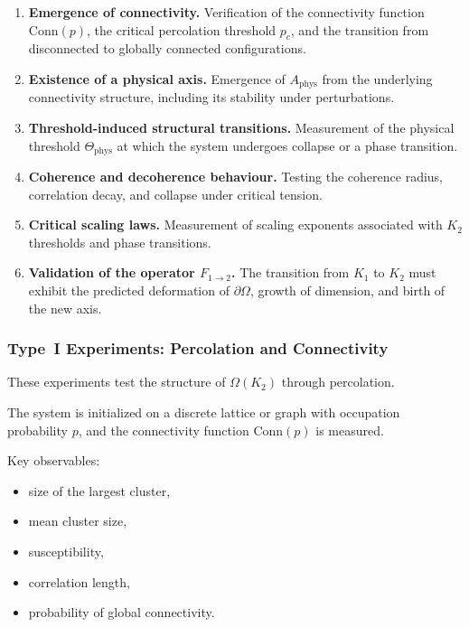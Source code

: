 \begin{enumerate}
    \item \textbf{Emergence of connectivity.}  
          Verification of the connectivity function $\mathrm{Conn}(p)$, 
          the critical percolation threshold $p_c$, and the transition 
          from disconnected to globally connected configurations.

    \item \textbf{Existence of a physical axis.}  
          Emergence of $A_{\mathrm{phys}}$ from the underlying 
          connectivity structure, including its stability under perturbations.

    \item \textbf{Threshold-induced structural transitions.}  
          Measurement of the physical threshold $\Theta_{\mathrm{phys}}$ 
          at which the system undergoes collapse or a phase transition.

    \item \textbf{Coherence and decoherence behaviour.}  
          Testing the coherence radius, correlation decay, and collapse 
          under critical tension.

    \item \textbf{Critical scaling laws.}  
          Measurement of scaling exponents associated with $K_2$ thresholds 
          and phase transitions.

    \item \textbf{Validation of the operator $F_{1 \rightarrow 2}$.}  
          The transition from $K_1$ to $K_2$ must exhibit the predicted 
          deformation of $\partial\Omega$, growth of dimension, and 
          birth of the new axis.
\end{enumerate}



\subsubsection{Type~I Experiments: Percolation and Connectivity}

These experiments test the structure of $\Omega(K_2)$ through percolation.

The system is initialized on a discrete lattice or graph with occupation 
probability $p$, and the connectivity function $\mathrm{Conn}(p)$ is measured.

Key observables:

\begin{itemize}
    \item size of the largest cluster,
    \item mean cluster size,
    \item susceptibility,
    \item correlation length,
    \item probability of global connectivity.
\end{itemize}

